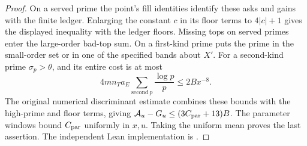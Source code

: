 \begin{proof}
On a served prime the point's fill identities identify these asks
and gains with the finite ledger. Enlarging the constant \(c\)
in its floor terms to \(4|c|+1\) gives the displayed inequality
with the ledger floors. Missing tops on served primes enter the
large-order bad-top sum. On a first-kind prime 
puts the prime in the small-order set or in one of the specified
bands about \(X'\). For a second-kind prime
\(\sigma_p>\theta\), and its entire cost is at most
\[
    4m n_T a_E\sum_{\mathrm{second}\ p}\frac{\log p}{p}
        \le 2Bx^{-8}.
\]
The original numerical discriminant estimate
 combines these bounds with
the high-prime and floor terms, giving
\(\mathcal A_u-G_u\le(3C_{\rm par}+13)B\).
The parameter windows bound \(C_{\rm par}\) uniformly in \(x,u\).
Taking the uniform mean proves the last assertion. The independent
Lean implementation is .
\end{proof}

